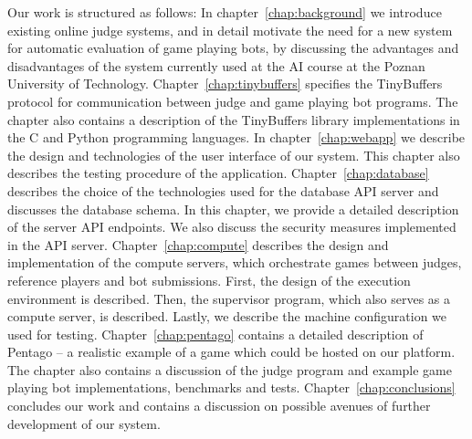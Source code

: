 Our work is structured as follows:
In chapter~\ref{chap:background} we introduce existing online judge systems, and in detail motivate the need for a new system for automatic evaluation of game playing bots, by discussing the advantages and disadvantages of the system currently used at the AI course at the Poznan University of Technology.  
Chapter~\ref{chap:tinybuffers} specifies the TinyBuffers protocol for communication between judge and game playing bot programs. The chapter also contains a description of the TinyBuffers library implementations in the C and Python programming languages.
In chapter~\ref{chap:webapp} we describe the design and technologies of the user interface of our system. This chapter also describes the testing procedure of the application. 
Chapter~\ref{chap:database} describes the choice of the technologies used for the database API server and discusses the database schema. In this chapter, we provide a detailed description of the server  API endpoints. We also discuss the security measures implemented in the API server.
Chapter~\ref{chap:compute} describes the design and implementation of the compute servers, which orchestrate games between judges, reference players and bot submissions. First, the design of the execution environment is described. Then, the supervisor program, which also serves as a compute server, is described. Lastly, we describe the machine configuration we used for testing. Chapter~\ref{chap:pentago} contains a detailed description of Pentago -- a realistic example of a game which could be hosted on our platform. The chapter also contains a discussion of the judge program and example game playing bot implementations, benchmarks and tests.
Chapter~\ref{chap:conclusions} concludes our work and contains a discussion on possible avenues of further development of our system.

